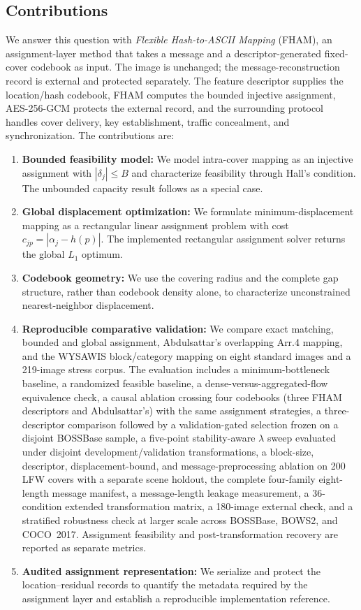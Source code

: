 \documentclass[preprint,12pt]{elsarticle}
\theoremstyle{plain}
\begin{document}
\subsection{Contributions}
We answer this question with \textit{Flexible Hash-to-ASCII Mapping} (FHAM), an assignment-layer method that takes a message and a descriptor-generated fixed-cover codebook as input. The image is unchanged; the message-reconstruction record is external and protected separately. The feature descriptor supplies the location/hash codebook, FHAM computes the bounded injective assignment, AES-256-GCM protects the external record, and the surrounding protocol handles cover delivery, key establishment, traffic concealment, and synchronization. The contributions are:
\begin{enumerate}
    \item \textbf{Bounded feasibility model:} We model intra-cover mapping as an injective assignment with $|\delta_j|\leq B$ and characterize feasibility through Hall's condition. The unbounded capacity result follows as a special case.

    \item \textbf{Global displacement optimization:} We formulate minimum-displacement mapping as a rectangular linear assignment problem with cost $c_{jp}=|\alpha_j-h(p)|$. The implemented rectangular assignment solver returns the global $L_1$ optimum.

    \item \textbf{Codebook geometry:} We use the covering radius and the complete gap structure, rather than codebook density alone, to characterize unconstrained nearest-neighbor displacement.

    \item \textbf{Reproducible comparative validation:} We compare exact matching, bounded and global assignment, Abdulsattar's overlapping Arr.4 mapping, and the WYSAWIS block/category mapping on eight standard images and a 219-image stress corpus. The evaluation includes a minimum-bottleneck baseline, a randomized feasible baseline, a dense-versus-aggregated-flow equivalence check, a causal ablation crossing four codebooks (three FHAM descriptors and Abdulsattar's) with the same assignment strategies, a three-descriptor comparison followed by a validation-gated selection frozen on a disjoint BOSSBase sample, a five-point stability-aware $\lambda$ sweep evaluated under disjoint development/validation transformations, a block-size, descriptor, displacement-bound, and message-preprocessing ablation on 200 LFW covers with a separate scene holdout, the complete four-family eight-length message manifest, a message-length leakage measurement, a 36-condition extended transformation matrix, a 180-image external check, and a stratified robustness check at larger scale across BOSSBase, BOWS2, and COCO~2017. Assignment feasibility and post-transformation recovery are reported as separate metrics.

    \item \textbf{Audited assignment representation:} We serialize and protect the location--residual records to quantify the metadata required by the assignment layer and establish a reproducible implementation reference.
\end{enumerate}
\end{document}
